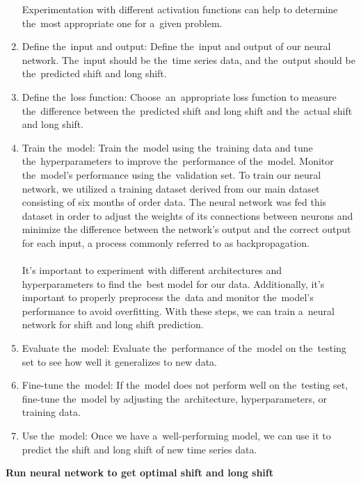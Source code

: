 \begin{enumerate}
            Experimentation with different activation functions can help to determine the~most appropriate one
            for a~given problem.\\
            \item Define the~input and output: Define the~input and output of our neural network. The~input should
            be the~time series data, and the~output should be the~predicted shift and long shift.
            \item Define the~loss function: Choose~an~appropriate loss function to measure the~difference
            between the~predicted shift and long shift and the~actual shift and long shift.
            \item Train the~model: Train the~model using the~training data and tune the~hyperparameters to
            improve the~performance of the~model. Monitor the~model's performance using the~validation set.
            To train our neural network, we utilized a training dataset derived from our main dataset consisting of six months of order data. The neural network was fed this dataset in order to adjust the weights of its connections between neurons and minimize the difference between the network's output and the correct output for each input, a process commonly referred to as backpropagation.\\
            \\
            It's important to experiment with different architectures and hyperparameters to find the~best model for
            our data. Additionally, it's important to properly preprocess the~data and monitor the~model's performance
            to avoid overfitting. With these steps, we can train a~neural network for shift and long shift prediction.\\
            \item Evaluate the~model: Evaluate the~performance of the~model on the~testing set to see how well
            it generalizes to new data.
            \item Fine-tune the~model: If the~model does not perform well on the~testing set, fine-tune the~model by
            adjusting the~architecture, hyperparameters, or training data.
            \item Use the~model: Once we have a~well-performing model, we can use it to predict the
            shift and long shift of new time series data.
        \end{enumerate}
        \textbf{Run neural network to get optimal shift and long shift}\\
